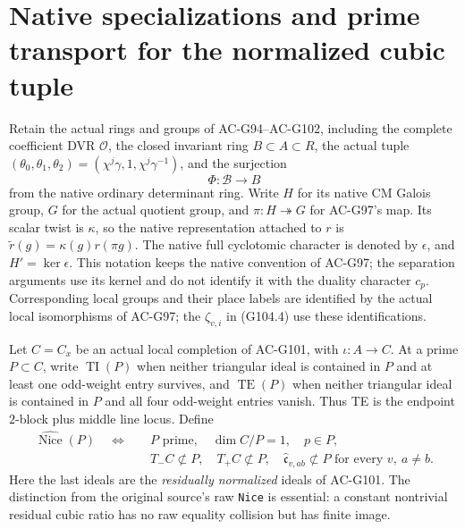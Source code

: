\section{Native specializations and prime transport for the normalized cubic tuple}
\label{sec:cubic-native-specialization}

Retain the actual rings and groups of AC-G94--AC-G102, including
the complete coefficient DVR \(\mathcal O\), the closed invariant
ring \(B\subset A\subset R\), the actual tuple
\((\theta_0,\theta_1,\theta_2)=(\chi^j\gamma,1,\chi^j\gamma^{-1})\),
and the surjection
\[
                  \Phi:\mathscr B\longrightarrow B
\tag{G104.1}
\]
from the native ordinary determinant ring.  Write \(H\) for its
native CM Galois group, \(G\) for the actual quotient group, and
\(\pi:H\twoheadrightarrow G\) for AC-G97's map.  Its scalar twist
is \(\kappa\), so the native representation attached to \(r\) is
\(\widetilde r(g)=\kappa(g)r(\pi g)\).
The native full cyclotomic character is denoted by \(\epsilon\),
and \(H'=\ker\epsilon\).  This notation keeps the native convention
of AC-G97; the separation arguments use its kernel and do not
identify it with the duality character \(c_p\).  Corresponding local
groups and their place labels are identified by the actual local
isomorphisms of AC-G97; the \(\zeta_{v,i}\) in (G104.4) use
these identifications.

Let \(C=C_x\) be an actual local completion of AC-G101, with
\(\iota:A\to C\).  At a prime \(P\subset C\), write
\(\operatorname{TI}(P)\) when neither triangular ideal is contained
in \(P\) and at least one odd-weight entry survives, and
\(\operatorname{TE}(P)\) when neither triangular ideal is contained
in \(P\) and all four odd-weight entries vanish.  Thus TE is the
endpoint \(2\)-block plus middle line locus.  Define
\[
\begin{split}
 \widehat{\operatorname{Nice}}(P)\quad\Longleftrightarrow\quad &
 P\text{ prime},\quad \dim C/P=1,\quad p\in P,\\
 &T_-C\not\subset P,\quad T_+C\not\subset P,\quad
 \widehat{\mathfrak c}_{v,ab}\not\subset P
                    \text{ for every }v,\ a\ne b .
\end{split}
\tag{G104.2}
\]
Here the last ideals are the \emph{residually normalized} ideals
of AC-G101.  The distinction from the original source's raw
\texttt{Nice} is essential: a constant nontrivial residual cubic
ratio has no raw equality collision but has finite image.

